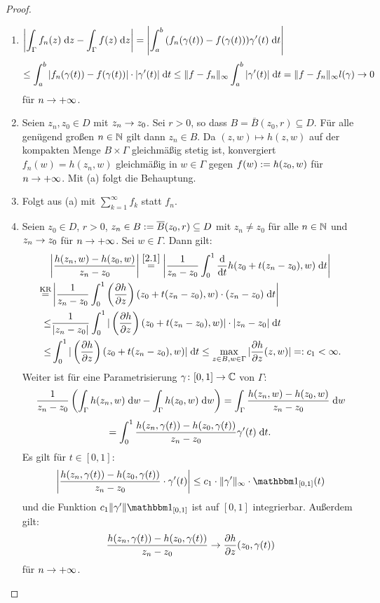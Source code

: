 \documentclass[a4paper,twoside,DIV15,BCOR12mm]{scrbook}
\begin{document}
\begin{proof}\begin{enumerate}
\item $\displaystyle\left|\int_{\Gamma}^{}{f_n(z)}\;\mathrm{d} z-\int_{\Gamma}^{}{f(z)}\;\mathrm{d} z\right| = \left|\int_{a}^{b}{(f_n(\gamma(t))-f(\gamma(t)))\gamma^\prime(t)}\;\mathrm{d} t\right|$
\[\leq\int_{a}^{b}{|f_n(\gamma(t))-f(\gamma(t))|\cdot|\gamma^\prime(t)|}\;\mathrm{d} t\leq\|f-f_n\|_\infty\int_{a}^{b}{|\gamma^\prime(t)|}\;\mathrm{d} t = \|f-f_n\|_\infty l(\gamma)\rightarrow 0\]
für $n\rightarrow+\infty$.

\item Seien $z_n,z_0\in D$ mit $z_n\rightarrow z_0$. Sei $r>0$, so dass $B=\bar{B}(z_0,r)\subseteq D$. Für alle genügend großen $n\in\mathbb{N}$ gilt dann $z_n\in B$. Da $(z,w)\mapsto h(z,w)$ auf der kompakten Menge $B\times\Gamma$ gleichmäßig stetig ist, konvergiert $f_n(w) = h(z_n,w)$ gleichmäßig in $w\in\Gamma$ gegen $f(w):= h(z_0,w)$ für $n\rightarrow+\infty$. Mit (a) folgt die Behauptung.

\item Folgt aus (a) mit $\displaystyle\sum_{k=1}^\infty f_k$ statt $f_n$.

\item Seien $z_0\in D$, $r>0$, $z_n\in B:= \overline{B}(z_0,r)\subseteq D$ mit $z_n\neq z_0$ für alle $n\in\mathbb{N}$ und $z_n\rightarrow z_0$ für $n\rightarrow+\infty$. Sei $w\in\Gamma$. Dann gilt:
\begin{gather*}
\left|\frac{h(z_n,w)-h(z_0,w)}{z_n-z_0}\right| \overset{\eqref{2.1}}{=}\left|\frac{1}{z_n-z_0}\int_{0}^{1}{\frac{\mathrm{d}}{\mathrm{d} t}h(z_0+t(z_n-z_0),w)}\;\mathrm{d} t\right|\\
\begin{split}
\overset{\text{KR}}{=}&\left|\frac{1}{z_n-z_0}\int_{0}^{1}{\left(\frac{\partial h}{\partial z}\right)(z_0+t(z_n-z_0),w)\cdot(z_n-z_0)}\;\mathrm{d} t\right|\\ 
\leq& \frac{1}{|z_n-z_0|}\int_{0}^{1}{|\left(\frac{\partial h}{\partial z}\right)(z_0+t(z_n-z_0),w)|\cdot|z_n-z_0|}\;\mathrm{d} t\\
\leq&\int_{0}^{1}{|\left(\frac{\partial h}{\partial z}\right)(z_0+t(z_n-z_0),w)|}\;\mathrm{d} t \leq \max_{z\in B,w\in\Gamma} |\frac{\partial h}{\partial z}(z,w)| =: c_1 < \infty.
\end{split}\end{gather*}
Weiter ist für eine Parametrisierung $\gamma\colon[0,1]\rightarrow\mathbb{C}$ von $\Gamma$:
\[\frac{1}{z_n-z_0}\left(\int_{\Gamma}^{}{h(z_n,w)}\;\mathrm{d} w-\int_{\Gamma}^{}{h(z_0,w)}\;\mathrm{d} w\right) = \int_{\Gamma}^{}{\frac{h(z_n,w)-h(z_0,w)}{z_n-z_0}}\;\mathrm{d} w\]
\[=\int_{0}^{1}{\frac{h(z_n,\gamma(t))-h(z_0,\gamma(t))}{z_n-z_0}\gamma^\prime(t)}\;\mathrm{d} t.\]
Es gilt für $t\in[0,1]$:
\[\left|\frac{h(z_n,\gamma(t))-h(z_0,\gamma(t))}{z_n-z_0}\cdot\gamma^\prime(t)\right| \leq c_1\cdot\|\gamma^\prime\|_\infty\cdot\charfnkt{[0,1]}(t)\]
und die Funktion $c_1\|\gamma^\prime\|\charfnkt{[0,1]}$ ist auf $[0,1]$ integrierbar. Außerdem gilt:
\[\frac{h(z_n,\gamma(t))-h(z_0,\gamma(t))}{z_n-z_0}\rightarrow\frac{\partial h}{\partial z}(z_0,\gamma(t))\]
für $n\rightarrow+\infty$.


\end{enumerate}
\end{proof}
\end{document}
